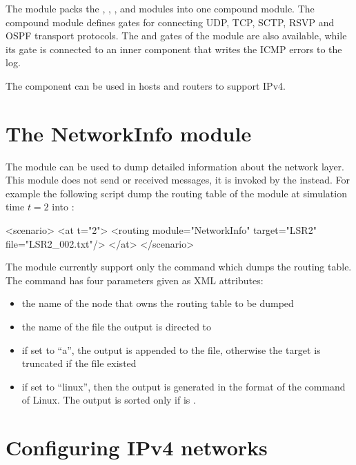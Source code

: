 The  module packs the , ,
, and  modules into one compound module.
The compound module defines gates for connecting UDP, TCP, SCTP, RSVP and
OSPF transport protocols. The  and  gates of the
 module are also available, while its  gate
is connected to an inner  component that writes
the ICMP errors to the log.

The component can be used in hosts and routers to support IPv4.

\section{The NetworkInfo module}

The  module can be used to dump detailed information
about the network layer. This module does not send or received messages,
it is invoked by the  instead. For example
the following  script dump the routing table
of the  module at simulation time $t=2$ into :
\begin{filelisting}
<scenario>
  <at t="2">
    <routing module="NetworkInfo" target="LSR2" file="LSR2_002.txt"/>
  </at>
</scenario>
\end{filelisting}

The module currently support only the  command which dumps
the routing table. The command has four parameters given as XML attributes:
\begin{itemize}
  \item {} the name of the node that owns the routing table to be dumped
  \item {} the name of the file the output is directed to
  \item {} if set to ``a'', the output is appended to the file,
                   otherwise the target is truncated if the file existed
  \item {} if set to ``linux'', then the output is generated
                     in the format of the  command of Linux.
                     The output is sorted only if  is
                     .
\end{itemize}

\section{Configuring IPv4 networks}

